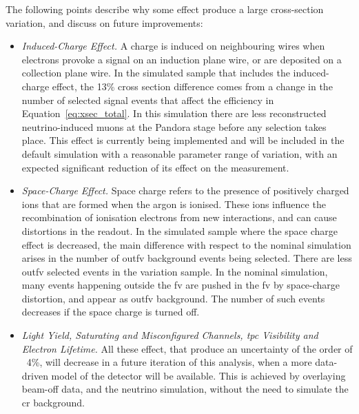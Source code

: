 The following points describe why some effect produce a large cross-section variation, and discuss on future improvements:
\begin{itemize}
\item \emph{Induced-Charge Effect.} A charge is induced on neighbouring wires when electrons provoke a signal on an induction plane wire, or are deposited on a collection plane wire. In the simulated sample that includes the induced-charge effect, the 13\% cross section difference comes from a change in the number of selected signal events that affect the efficiency in Equation~\eqref{eq:xsec_total}. In this simulation there are less reconstructed neutrino-induced muons at the Pandora stage before any selection takes place. This effect is currently being implemented and will be included in the default simulation with a reasonable parameter range of variation, with an expected significant reduction of its effect on the measurement.
\item \emph{Space-Charge Effect.} Space charge refers to the presence of positively charged ions that are formed when the argon is ionised. These ions influence the recombination of ionisation electrons from new interactions, and can cause distortions in the readout. In the simulated sample where the space charge effect is decreased, the main difference with respect to the nominal simulation arises in the number of \acrshort{outfv} background events being selected. There are less \acrshort{outfv} selected events in the variation sample. In the nominal simulation, many events happening outside the \acrshort{fv} are pushed in the \acrshort{fv} by space-charge distortion, and appear as \acrshort{outfv} background. The number of such events decreases if the space charge is turned off.  
\item \emph{Light Yield, Saturating and Misconfigured Channels, \acrshort{tpc} Visibility and Electron Lifetime.} All these effect, that produce an uncertainty of the order of ~4\%, will decrease in a future iteration of this analysis, when a more data-driven model of the detector will be available. This is achieved by overlaying beam-off data, and the \g neutrino simulation, without the need to simulate the \acrshort{cr} background.
\end{itemize}



